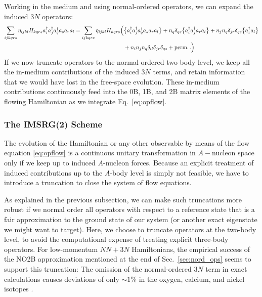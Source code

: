 {Working in the medium and using normal-ordered operators, we can expand the 
induced $3N$ operators:
\begin{align}\label{eq:induced_3N_no}
  \sum_{ijkqrs}\eta_{ijkl}H_{kqrs} \aaO_{i}\aaO_{j}\aaO_{q}\aO_{s}\aO_{r}\aO_{l}
  =\sum_{ijkqrs}\eta_{ijkl}H_{kqrs} 
    \Big(&
      \nord{\aaO_{i}\aaO_{j}\aaO_{q}\aO_{s}\aO_{r}\aO_{l}} 
       + n_q\delta_{qs}\nord{\aaO_{i}\aaO_{j}\aO_{r}\aO_{l}} 
       + n_j n_q\delta_{jr}\delta_{qs}\nord{\aaO_{i}\aO_{l}} \notag\\
  &
       + n_in_j n_q\delta_{il}\delta_{jr}\delta_{qs}+ \text{perm.}\,.
    \Big)
\end{align}
If we now truncate operators to the normal-ordered two-body level, we keep
all the in-medium contributions of the induced $3N$ terms, and retain 
information that we would have lost in the free-space evolution. These
in-medium contributions continuously feed into the 0B, 1B, and 2B matrix 
elements of the flowing Hamiltonian as we integrate Eq.~\eqref{eq:opflow}.

%
%
\subsubsection{The IMSRG(2) Scheme}
The evolution of the Hamiltonian or any other observable by means of
the flow equation \eqref{eq:opflow} is a continuous unitary transformation
in $A-$nucleon space only if we keep up to induced $A$-nucleon 
forces. Because an explicit treatment of induced contributions up to the 
$A$-body level is simply not feasible, we have to introduce a truncation 
to close the system of flow equations.

As explained in the previous subsection, we can make such truncations 
more robust if we normal order all operators with respect to a reference
state that is a fair approximation to the ground state of our system
(or another exact eigenstate we might want to target). Here, we choose
to truncate operators at the two-body level, to avoid the computational
expense of treating explicit three-body operators. For low-momentum $NN+3N$
Hamiltonians, the empirical success of the NO2B approximation mentioned 
at the end of Sec.~\ref{sec:nord_ops} seems to support this truncation: 
The omission of the normal-ordered $3N$ term in exact calculations causes 
deviations of only $\sim1\%$ in the oxygen, calcium, and nickel isotopes
\cite{Roth:2012qf,Binder:2013fk,Binder:2014fk}.

}
